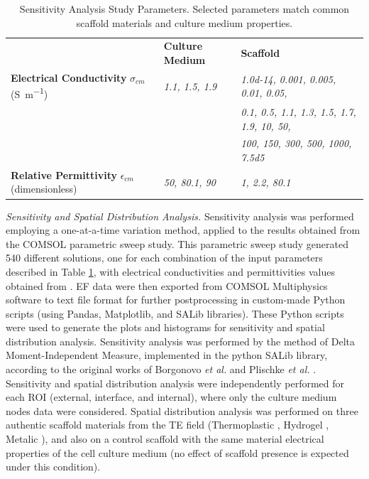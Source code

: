 \begin{table}
\caption{Sensitivity Analysis Study Parameters. Selected parameters match common scaffold materials and culture medium properties.}
\bigskip
\scriptsize
\centering
\begin{tabularx}{350px}{l l l} \toprule[0.15em]
& \textbf{Culture Medium}  & \textbf{Scaffold}  \\ \cmidrule(l){1-3}
\textbf{Electrical Conductivity} $\sigma_{cm}$ (\si{\siemens\per\meter}) & \textit{1.1, 1.5, 1.9} & \textit{\num{1.0d-14}, 0.001, 0.005, 0.01, 0.05,} \\
& & \textit{0.1, 0.5, 1.1, 1.3, 1.5, 1.7, 1.9, 10, 50,} \\
& & \textit{100, 150, 300, 500, 1000, \num{7.5d5}} \\
\textbf{Relative Permittivity} $\epsilon_{cm}$ (dimensionless) & \textit{50, 80.1, 90} & \textit{1, 2.2, 80.1} \\ \bottomrule[0.15em]
\end{tabularx}
\label{table_sensitivity}
\end{table}


\noindent \textit{Sensitivity and Spatial Distribution Analysis.} Sensitivity analysis was performed employing a one-at-a-time variation method, applied to the results obtained from the COMSOL parametric sweep study. This parametric sweep study generated 540 different solutions, one for each combination of the input parameters described in Table \ref{table_sensitivity}, with electrical conductivities and permittivities values obtained from \cite{Gavish2016-av, Bennett2019-js, Mazzoleni1986-wp}. \acs{EF} data were then exported from COMSOL Multiphysics software to text file format for further postprocessing in custom-made Python scripts (using Pandas, Matplotlib, and SALib libraries). These Python scripts were used to generate the plots and histograms for sensitivity and spatial distribution analysis. Sensitivity analysis was performed by the method of Delta Moment-Independent Measure, implemented in the python SALib library, according to the original works of Borgonovo \textit{et al.} and Plischke \textit{et al.} \cite{Borgonovo2007-tj, Plischke2013-ok}. Sensitivity and spatial distribution analysis were independently performed for each \acs{ROI} (external, interface, and internal), where only the culture medium nodes data were considered. Spatial distribution analysis was performed on three authentic scaffold materials from the \acs{TE} field (Thermoplastic \cite{Hegde2015-nd}, Hydrogel \cite{Distler2020-gi}, Metalic \cite{MetalInfo}), and also on a control scaffold with the same material electrical properties of the cell culture medium (no effect of scaffold presence is expected under this condition).


